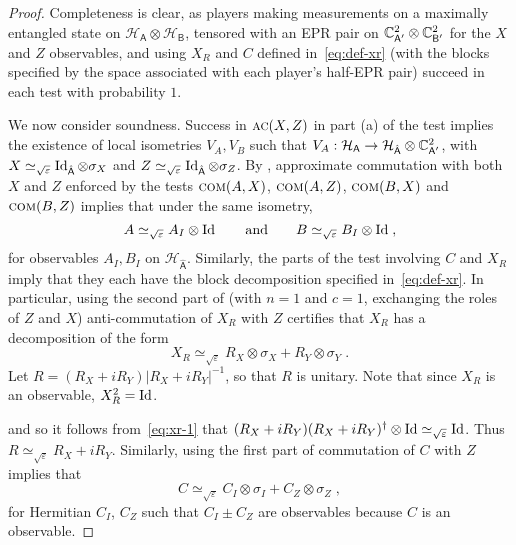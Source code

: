 \documentclass{toc}
\newcommand{\Id}{\ensuremath{\mathop{\rm Id}\nolimits}}
\newcommand{\reg}[1]{{\textsf{#1}}}
\newcommand{\mH}{\mathcal{H}}
\newcommand{\eps}{\varepsilon}
\newcommand{\comt}{\textsc{com}}
\newcommand{\act}{\textsc{ac}}
\begin{document}
\begin{proof}
Completeness is clear, as players making measurements on a maximally entangled state on $\mH_{\reg{A}}\otimes \mH_{\reg{B}}$, tensored with an EPR pair on $\C^2_{\reg{A}'} \otimes \C^2_{\reg{B}'}$ for the $X$ and $Z$ observables, and using $X_R$ and $C$ defined in~\eqref{eq:def-xr} (with the blocks specified by the space associated with each player's half-EPR pair) succeed in each test with probability $1$. 

We now consider soundness. Success in $\act(X,Z)$ in part (a) of the test implies the existence of local isometries $V_A,V_B$ such that $V_A:\mH_\reg{A}\to \mH_{\hat{\reg{A}}}\otimes \C^2_{\reg{A}'}$, with $X\simeq_{\sqrt{\eps}} \Id_{\hat{\reg{A}}}\otimes \sigma_X$ and $Z\simeq_{\sqrt{\eps}} \Id_{\hat{\reg{A}}}\otimes\sigma_Z$. By , approximate commutation with both $X$ and $Z$ enforced by the tests $\comt(A,X)$, $\comt(A,Z)$, $\comt(B,X)$ and $\comt(B,Z)$ implies that under the same isometry, 
\begin{equation}\label{eq:cliff-2c}
A\simeq_{\sqrt{\eps}} A_I \otimes \Id\qquad\text{and}\qquad B\simeq_{\sqrt{\eps}} B_I \otimes \Id\;,
\end{equation}
 for observables $A_I, B_I$ on $\mH_{\hat{\reg{A}}}$. Similarly, the parts of the test involving $C$ and $X_R$ imply that they each have the block decomposition specified in~\eqref{eq:def-xr}. 
In particular, using the second part of  (with $n=1$ and $c=1$, exchanging the roles of $Z$ and $X$) anti-commutation of $X_R$ with $Z$ certifies that $X_R$ has  a decomposition of the form  
\begin{equation}\label{eq:xr-1}
X_R \simeq_{\sqrt{\eps}} R_X \otimes \sigma_X + R_Y \otimes \sigma_Y\;.
\end{equation}
Let $R = ( R_X + i R_Y)| R_X + i R_Y|^{-1}$, so that $R$ is unitary. Note that since $X_R$ is an observable, $X_R^2=\Id$. 


 and so it follows from~\eqref{eq:xr-1} that $(R_X+iR_Y)(R_X+iR_Y)^\dagger \otimes \Id \simeq_{\sqrt{\eps}} \Id$. Thus $R \simeq_{\sqrt{\eps}} R_X + i R_Y$. 
 Similarly, using the first part of  commutation of $C$ with $Z$ implies that 
\begin{equation}\label{clif-2ab}
C \simeq_{\sqrt{\eps}} C_I \otimes \sigma_I + C_Z \otimes \sigma_Z\;,
\end{equation}
 for Hermitian $C_I$, $C_Z$ such that $C_I \pm C_Z$ are observables because $C$ is an observable. 


\end{proof}
\end{document}
